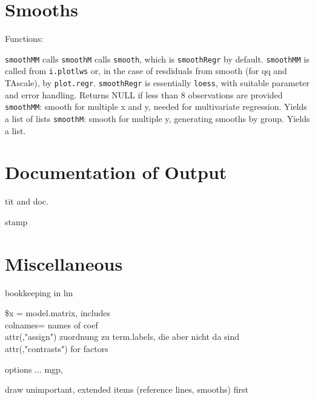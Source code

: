 \documentclass[11pt]{article}
\def\code{\texttt}
\begin{document}
\section{Smooths}
Functions:

\code{smoothMM} calls \code{smoothM} calls \code{smooth}, 
which is \code{smoothRegr} by default.
\code{smoothMM} is called from \code{i.plotlws} or, in the case of
resdiduals from smooth (for qq and TAscale), by \code{plot.regr}.
\Itm
\code{smoothRegr} is essentially \code{loess}, with suitable parameter and
error handling. Returns NULL if less than 8 observations are provided
\Itm
\code{smoothMM}: smooth for multiple x and y, needed for multivariate
regression.
Yields a list of lists
\Itm
\code{smoothM}: smooth for multiple y, generating smooths by group. 
Yields a list.


\section{Documentation of Output}
tit and doc.

stamp

\section{Miscellaneous}
\Itm
bookkeeping in lm

\$x = model.matrix, includes\\
  colnames= names of coef\\
  attr(,"assign") zuordnung zu term.labels, die aber nicht da sind\\
  attr(,"contrasts") for factors

\Itm
options ... mgp, 

\Itm
draw unimportant, extended items (reference lines, smooths) first
\end{document}
